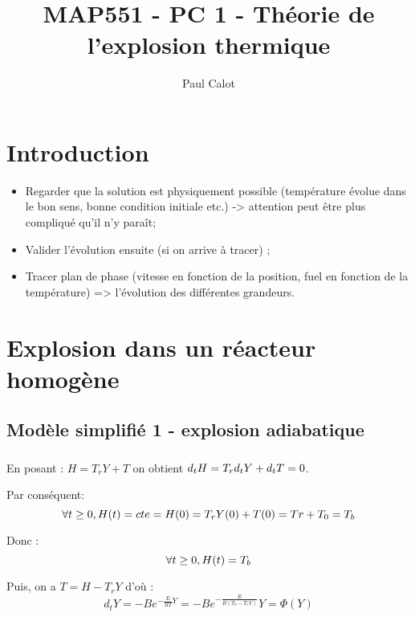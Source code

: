 \documentclass[10pt,a4paper,twocolumn]{report}
\author{Paul Calot}
\title{MAP551 - PC 1 - Théorie de l’explosion thermique}
\begin{document}
\maketitle


\chapter{Introduction}

\begin{itemize}
 \item Regarder que la solution est physiquement possible (température évolue dans le bon sens, bonne condition initiale etc.) -> attention peut être plus compliqué qu'il n'y paraît;
 \item Valider l'évolution ensuite (si on arrive à tracer) ;
 \item Tracer plan de phase (vitesse en fonction de la position, fuel en fonction de la température) => l'évolution des différentes grandeurs.
\end{itemize}

\chapter{Explosion dans un réacteur homogène}

\section{Modèle simplifié 1 - explosion adiabatique}

\subsection{ }

\subsubsection{} 

En posant : $ H = T_r Y + T $ on obtient $d_tH = T_r \space d_tY+d_tT = 0$. 

Par conséquent:  $$\forall t \geq 0, \space H(t) = cte = H(0) = T_r Y(0) + T(0) = Tr + T_0 = T_b $$

Donc : $$\forall t \geq 0, \space H(t) = T_b$$

Puis, on a $T= H-T_rY$ d'où : 
$$ d_tY = -B e^{-\frac{E}{RT}Y} = -B e^{-\frac{E}{R(T_b-T_rY)}} Y = \Phi(Y)$$
\end{document}
